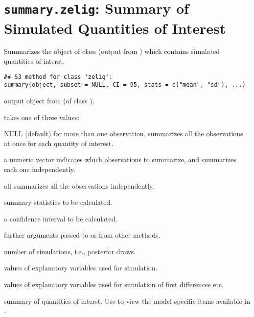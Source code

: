  \section{{\tt summary.zelig}: Summary of Simulated Quantities of Interest}\label{ss:summary.zelig}
\begin{Description}\relax
Summarizes the object of class  (output
from ) which contains simulated quantities of
interst.
\end{Description}
\begin{Usage}
\begin{verbatim}
## S3 method for class 'zelig':
summary(object, subset = NULL, CI = 95, stats = c("mean", "sd"), ...)
\end{verbatim}
\end{Usage}
\begin{Arguments}
\begin{ldescription}
\item[\code{object}] output object from  (of class
).
\item[\code{subset}] takes one of three values:
\item[NULL] (default) for more than one observation, summarizes all the
observations at once for each quantity of interest.
\item[a numeric vector] indicates which observations to summarize,
and summarizes each one independently.
\item[all] summarizes all the observations independently.

\item[\code{stats}] summary statistics to be calculated.
\item[\code{CI}] a confidence interval to be calculated.
\item[\code{...}] further arguments passed to or from other methods.
\end{ldescription}
\end{Arguments}
\begin{Value}
\begin{ldescription}
\item[\code{sim}] number of simulations, i.e., posterior draws.
\item[\code{x}] values of explanatory variables used for simulation.
\item[\code{x1}] values of explanatory variables used for simulation of first
differences etc.
\item[\code{qi.stats}] summary of quantities of interst.  Use
 to view the model-specific items available in
.
\end{ldescription}
\end{Value}
